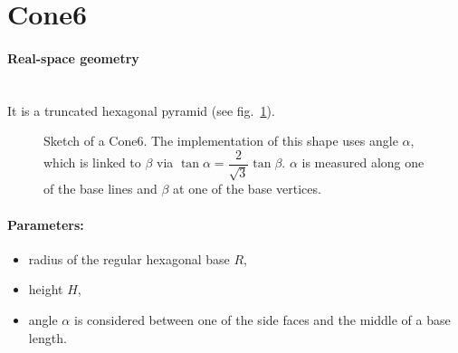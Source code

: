 \newpage
\section{Cone6}  

\paragraph{Real-space geometry}\mbox{}\\
It is a truncated hexagonal pyramid (see fig.~\ref{fig:cone6}). 

\begin{figure}[ht]
\hfill
{}
\hfill
{}
\hfill
\caption{Sketch of a Cone6.  The implementation of this shape uses angle
  $\alpha$, which is linked to $\beta$ via $\tan \alpha = \dfrac{2}{\sqrt{3}} \tan 
  \beta$. $\alpha$ is measured along one of the base lines and $\beta$
  at one of the base vertices.}
\label{fig:cone6}
\end{figure}

\FloatBarrier

\paragraph{Parameters:}
\begin{itemize}
\item radius of the regular hexagonal base $R$,
\item height $H$,
\item angle $\alpha$ is considered between one of the side faces and
  the middle of a base length. 
\end{itemize}

